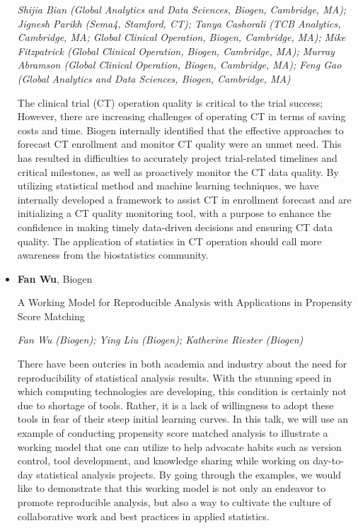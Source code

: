\begin{itemize}
\emph{\footnotesize Shijia Bian (Global Analytics and Data Sciences, Biogen, Cambridge, MA); Jignesh Parikh (Sema4, Stamford, CT); Tanya Cashorali (TCB Analytics, Cambridge, MA; Global Clinical Operation, Biogen, Cambridge, MA); Mike Fitzpatrick (Global Clinical Operation, Biogen, Cambridge, MA); Murray Abramson (Global Clinical Operation, Biogen, Cambridge, MA); Feng Gao (Global Analytics and Data Sciences, Biogen, Cambridge, MA)}

The clinical trial (CT) operation quality is critical to the trial success; However, there are increasing challenges of operating CT in terms of saving costs and time. Biogen internally identified that the effective approaches to forecast CT enrollment and monitor CT quality were an unmet need. This has resulted in difficulties to accurately project trial-related timelines and critical milestones, as well as proactively monitor the CT data quality. By utilizing statistical method and machine learning techniques, we have internally developed a framework to assist CT in enrollment forecast and are initializing a CT quality monitoring tool, with a purpose to enhance the confidence in making timely data-driven decisions and ensuring CT data quality. The application of statistics in CT operation should call more awareness from the biostatistics community.

\item \textbf{Fan Wu}, Biogen

A Working Model for Reproducible Analysis with Applications in Propensity Score Matching

\emph{\footnotesize Fan Wu (Biogen); Ying Liu (Biogen); Katherine Riester (Biogen)}

There have been outcries in both academia and industry about the need for reproducibility of statistical analysis results.  With the stunning speed in which computing technologies are developing, this condition is certainly not due to shortage of tools.  Rather, it is a lack of willingness to adopt these tools in fear of their steep initial learning curves.  In this talk, we will use an example of conducting propensity score matched analysis to illustrate a working model that one can utilize to help advocate habits such as version control, tool development, and knowledge sharing while working on day-to-day statistical analysis projects.  By going through the examples, we would like to demonstrate that this working model is not only an endeavor to promote reproducible analysis, but also a way to cultivate the culture of collaborative work and best practices in applied statistics.


\end{itemize}

